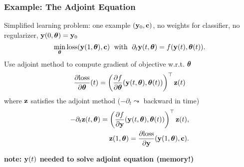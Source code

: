 \documentclass[12pt,fleqn, beamer]{beamer}
\begin{document}
	\begin{frame}
		\frametitle{Example: The Adjoint Equation}
		
		Simplified learning problem: one example $({\bf y}_0, {\bf c})$, no weights for classifier, no regularizer, ${\bf y}(0,{\boldsymbol \theta}) = {\bf y}_0$
		\begin{equation*}
			\min_{{\boldsymbol \theta}} {\rm loss}({\bf y}(1,{\boldsymbol \theta}), {\bf c}) \; \text{ with } \; \partial_t {\bf y}(t,{\boldsymbol \theta}) = f({\bf y}(t),{\boldsymbol \theta}(t)).
		\end{equation*}
		\pause
		Use adjoint method to compute gradient of objective w.r.t. ${\boldsymbol \theta}$
		\begin{equation*}
			\frac{\partial {\rm loss}}{\partial {\boldsymbol \theta}}(t) = \left(\frac{\partial f}{\partial {\boldsymbol \theta}}({{\bf y}(t,{\boldsymbol \theta})}, {\boldsymbol \theta}(t))\right)^\top {\bf z}(t)
		\end{equation*}
		where ${\bf z}$ satisfies the adjoint method ($-\partial_t \leadsto$ backward in time)
		\begin{align*}
			-\partial_t {\bf z}(t,{\boldsymbol \theta}) = \left(\frac{\partial f}{\partial {\bf y}} ({{\bf y}(t,{\boldsymbol \theta})},{\boldsymbol \theta}(t))\right)^\top {\bf z}(t), \\
			{\bf z}(1,{\boldsymbol \theta})= \frac{\partial {\rm loss}}{\partial {\bf y}} ({{\bf y}(1,{\boldsymbol \theta})}, {\bf c}).
		\end{align*}
		\pause
	\begin{center}
		\textbf{note: ${\bf y}(t)$ needed to solve adjoint equation (memory!)}
	\end{center}
	
%
	\end{frame}
\end{document}

